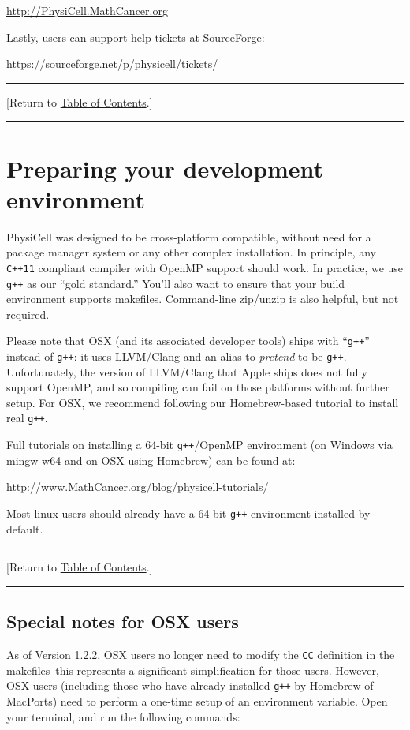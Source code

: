 \documentclass[12pt]{article}
\renewcommand{\v}{\verb}
\newcommand{\blue}[1]{\textcolor{blue}{#1}}
\newcommand{\DONE}{}%
\newcommand{\TOClink}{\begin{center}\hrule\vskip-5pt\phantom{.}\hfill[Return to \hyperlink{TOC}{Table of Contents}.]\hfill\phantom{.}\vskip3pt\hrule\end{center}}
\begin{document}
\begin{center}
\href{http://PhysiCell.MathCancer.org}{http://PhysiCell.MathCancer.org}
\end{center}

Lastly, users can support help tickets at SourceForge: 

\begin{center}
\href{https://sourceforge.net/p/physicell/tickets/}{https://sourceforge.net/p/physicell/tickets/}
\end{center}

\TOClink 

\section{Preparing your development environment \DONE}
\label{sec:preparing_environment}
PhysiCell was designed to be cross-platform compatible, without need for a package manager system or any other 
complex installation. In principle, any \v|C++11| compliant compiler with OpenMP support should work. In 
practice, we use \v|g++| as our ``gold standard.'' You'll also want to ensure that your build environment supports 
makefiles. Command-line zip/unzip is also helpful, but not required. 

Please note that OSX (and its associated developer tools) 
ships with ``\v|g++|'' instead of \v|g++|: it uses LLVM/Clang and an alias to \emph{pretend} to be \v|g++|. 
Unfortunately, the version of LLVM/Clang that Apple ships does not fully support OpenMP, and so compiling can 
fail on those platforms without further setup. For OSX, we recommend following our 
Homebrew-based tutorial to install real \v|g++|. 

Full tutorials on installing a 64-bit \v|g++|/OpenMP environment (on Windows via mingw-w64 and on OSX using Homebrew) 
can be found at: 

\href{http://www.mathcancer.org/blog/physicell-tutorials/}{http://www.MathCancer.org/blog/physicell-tutorials/}

Most linux users should already have a 64-bit \v|g++| environment installed by default. 

\TOClink

\subsection{Special notes for OSX users}
\label{sec:osx_setup_note}
As of Version 1.2.2, OSX users no longer need to modify the \v|CC| definition in the makefiles--this 
represents a significant simplification for those users. However, OSX users (including those who 
have already installed \v|g++| by Homebrew of MacPorts) need to perform a one-time setup 
of an environment variable. Open your terminal, and run the following commands: 
\end{document}
